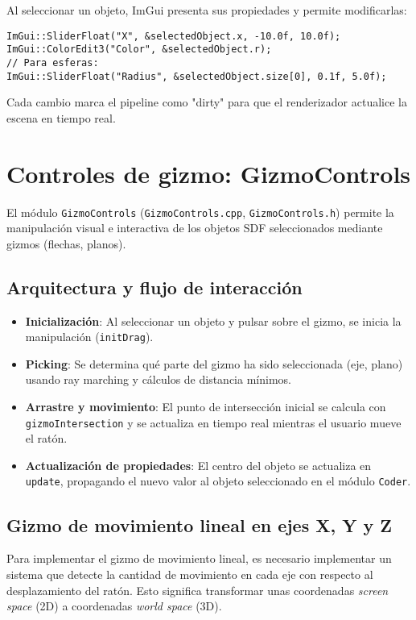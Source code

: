Al seleccionar un objeto, ImGui presenta sus propiedades y permite
modificarlas:
\begin{verbatim}
ImGui::SliderFloat("X", &selectedObject.x, -10.0f, 10.0f);
ImGui::ColorEdit3("Color", &selectedObject.r);
// Para esferas:
ImGui::SliderFloat("Radius", &selectedObject.size[0], 0.1f, 5.0f);
\end{verbatim}
Cada cambio marca el pipeline como "dirty" para que el renderizador actualice
la escena en tiempo real.

\section{Controles de gizmo: GizmoControls}

El módulo \texttt{GizmoControls} (\texttt{GizmoControls.cpp},
\texttt{GizmoControls.h}) permite la manipulación visual e interactiva de los
objetos SDF seleccionados mediante gizmos (flechas, planos).

\subsection{Arquitectura y flujo de interacción}

\begin{itemize}
    \item \textbf{Inicialización}: Al seleccionar un objeto y pulsar sobre el gizmo, se inicia la manipulación (\texttt{initDrag}).
    \item \textbf{Picking}: Se determina qué parte del gizmo ha sido seleccionada (eje, plano) usando ray marching y cálculos de distancia mínimos.
    \item \textbf{Arrastre y movimiento}: El punto de intersección inicial se calcula con \texttt{gizmoIntersection} y se actualiza en tiempo real mientras el usuario mueve el ratón.
    \item \textbf{Actualización de propiedades}: El centro del objeto se actualiza en \texttt{update}, propagando el nuevo valor al objeto seleccionado en el módulo \texttt{Coder}.
\end{itemize}

\subsection{Gizmo de movimiento lineal en ejes X, Y y Z}

Para implementar el gizmo de movimiento lineal, es necesario implementar un
sistema que detecte la cantidad de movimiento en cada eje con respecto al
desplazamiento del ratón. Esto significa transformar unas coordenadas
\textit{screen space} (2D) a coordenadas \textit{world space} (3D).

